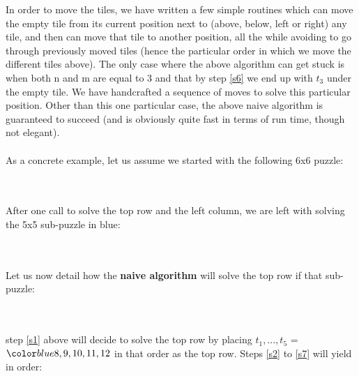 In order to move the tiles, we have written a few simple routines which can move the empty tile from its current position next to (above, below, left or right) any tile, and then can move that tile to another position, all the while avoiding to go through previously moved tiles (hence the particular order in which we move the different tiles above). The only case where the above algorithm can get stuck is when both n and m are equal to 3 and that by step \ref{s6} we end up with $t_{3}$ under the empty tile. We have handcrafted a sequence of moves to solve this particular position. Other than this one particular case, the above naive algorithm is guaranteed to succeed (and is obviously quite fast in terms of run time, though not elegant).
\\
\\
As a concrete example, let us assume we started with the following 6x6 puzzle:
\\
\begin{thityfive}
\end{thityfive}
\\
\\
After one call to solve the top row and the left column, we are left with solving the 5x5 sub-puzzle in blue:
\\
\begin{thityfive}
\end{thityfive}
\\
\\
Let us now detail how the \textbf{naive algorithm} will solve the top row if that sub-puzzle:
\\
\begin{twentyfour}
\end{twentyfour}
\\
\\
step \ref{s1} above will decide to solve the top row by placing $t_{1}, ..., t_{5}$ = $\blue 8, 9, 10, 11, 12$ in that order as the top row. Steps \ref{s2} to \ref{s7} will yield in order:
